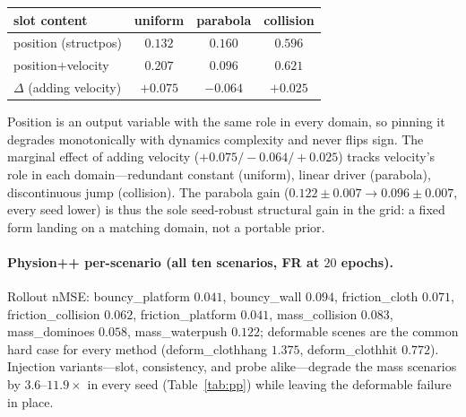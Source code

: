 \begin{center}\small
\begin{tabular}{@{}lccc@{}}
\toprule
slot content & uniform & parabola & collision \\
\midrule
position (structpos) & $0.132$ & $0.160$ & $0.596$ \\
position$+$velocity & $0.207$ & $0.096$ & $0.621$ \\
$\Delta$ (adding velocity) & $+0.075$ & $-0.064$ & $+0.025$ \\
\bottomrule
\end{tabular}
\end{center}

Position is an output variable with the same role in every domain, so pinning it degrades monotonically with dynamics complexity and never flips sign. The marginal effect of adding velocity ($+0.075/{-}0.064/{+}0.025$) tracks velocity's role in each domain---redundant constant (uniform), linear driver (parabola), discontinuous jump (collision). The parabola gain ($0.122\pm0.007\!\to\!0.096\pm0.007$, every seed lower) is thus the sole seed-robust structural gain in the grid: a fixed form landing on a matching domain, not a portable prior.

\paragraph{Physion++ per-scenario (all ten scenarios, FR at $20$ epochs).}
Rollout nMSE: bouncy\_platform $0.041$, bouncy\_wall $0.094$, friction\_cloth $0.071$, friction\_collision $0.062$, friction\_platform $0.041$, mass\_collision $0.083$, mass\_dominoes $0.058$, mass\_waterpush $0.122$; deformable scenes are the common hard case for every method (deform\_clothhang $1.375$, deform\_clothhit $0.772$). Injection variants---slot, consistency, and probe alike---degrade the mass scenarios by $3.6$--$11.9\times$ in every seed (Table~\ref{tab:pp}) while leaving the deformable failure in place.

